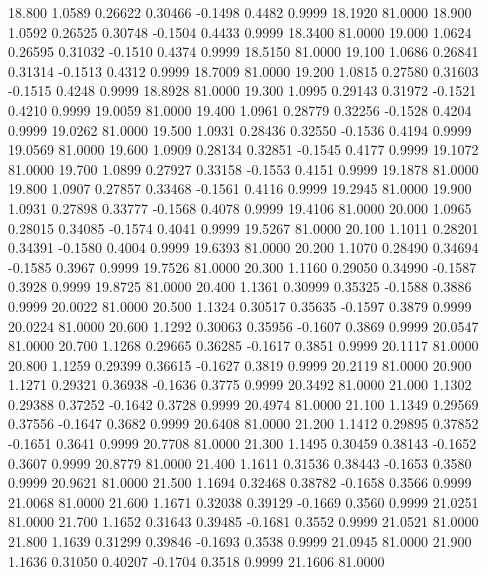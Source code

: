   18.800   1.0589   0.26622   0.30466  -0.1498   0.4482   0.9999  18.1920  81.0000
  18.900   1.0592   0.26525   0.30748  -0.1504   0.4433   0.9999  18.3400  81.0000
  19.000   1.0624   0.26595   0.31032  -0.1510   0.4374   0.9999  18.5150  81.0000
  19.100   1.0686   0.26841   0.31314  -0.1513   0.4312   0.9999  18.7009  81.0000
  19.200   1.0815   0.27580   0.31603  -0.1515   0.4248   0.9999  18.8928  81.0000
  19.300   1.0995   0.29143   0.31972  -0.1521   0.4210   0.9999  19.0059  81.0000
  19.400   1.0961   0.28779   0.32256  -0.1528   0.4204   0.9999  19.0262  81.0000
  19.500   1.0931   0.28436   0.32550  -0.1536   0.4194   0.9999  19.0569  81.0000
  19.600   1.0909   0.28134   0.32851  -0.1545   0.4177   0.9999  19.1072  81.0000
  19.700   1.0899   0.27927   0.33158  -0.1553   0.4151   0.9999  19.1878  81.0000
  19.800   1.0907   0.27857   0.33468  -0.1561   0.4116   0.9999  19.2945  81.0000
  19.900   1.0931   0.27898   0.33777  -0.1568   0.4078   0.9999  19.4106  81.0000
  20.000   1.0965   0.28015   0.34085  -0.1574   0.4041   0.9999  19.5267  81.0000
  20.100   1.1011   0.28201   0.34391  -0.1580   0.4004   0.9999  19.6393  81.0000
  20.200   1.1070   0.28490   0.34694  -0.1585   0.3967   0.9999  19.7526  81.0000
  20.300   1.1160   0.29050   0.34990  -0.1587   0.3928   0.9999  19.8725  81.0000
  20.400   1.1361   0.30999   0.35325  -0.1588   0.3886   0.9999  20.0022  81.0000
  20.500   1.1324   0.30517   0.35635  -0.1597   0.3879   0.9999  20.0224  81.0000
  20.600   1.1292   0.30063   0.35956  -0.1607   0.3869   0.9999  20.0547  81.0000
  20.700   1.1268   0.29665   0.36285  -0.1617   0.3851   0.9999  20.1117  81.0000
  20.800   1.1259   0.29399   0.36615  -0.1627   0.3819   0.9999  20.2119  81.0000
  20.900   1.1271   0.29321   0.36938  -0.1636   0.3775   0.9999  20.3492  81.0000
  21.000   1.1302   0.29388   0.37252  -0.1642   0.3728   0.9999  20.4974  81.0000
  21.100   1.1349   0.29569   0.37556  -0.1647   0.3682   0.9999  20.6408  81.0000
  21.200   1.1412   0.29895   0.37852  -0.1651   0.3641   0.9999  20.7708  81.0000
  21.300   1.1495   0.30459   0.38143  -0.1652   0.3607   0.9999  20.8779  81.0000
  21.400   1.1611   0.31536   0.38443  -0.1653   0.3580   0.9999  20.9621  81.0000
  21.500   1.1694   0.32468   0.38782  -0.1658   0.3566   0.9999  21.0068  81.0000
  21.600   1.1671   0.32038   0.39129  -0.1669   0.3560   0.9999  21.0251  81.0000
  21.700   1.1652   0.31643   0.39485  -0.1681   0.3552   0.9999  21.0521  81.0000
  21.800   1.1639   0.31299   0.39846  -0.1693   0.3538   0.9999  21.0945  81.0000
  21.900   1.1636   0.31050   0.40207  -0.1704   0.3518   0.9999  21.1606  81.0000
